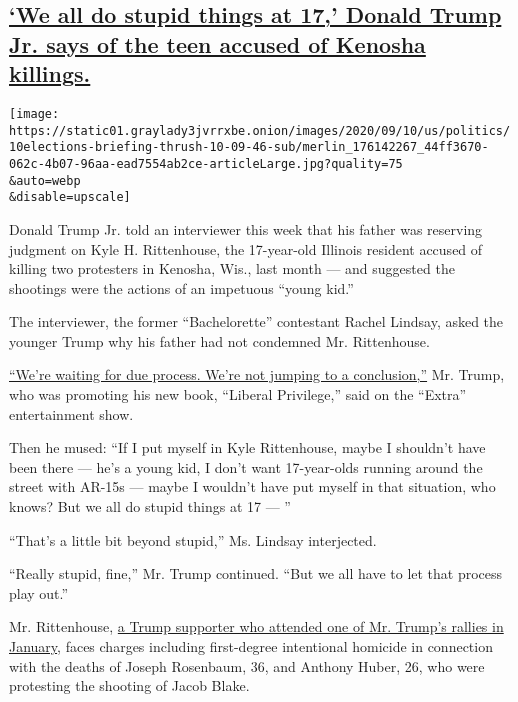 \hypertarget{we-all-do-stupid-things-at-17-donald-trump-jr-says-of-the-teen-accused-of-kenosha-killings}{%
\subsection{\texorpdfstring{\protect\hyperlink{we-all-do-stupid-things-at-17-donald-trump-jr-says-of-the-teen-accused-of-kenosha-killings}{`We
all do stupid things at 17,' Donald Trump Jr. says of the teen accused
of Kenosha
killings.}}{`We all do stupid things at 17,' Donald Trump Jr. says of the teen accused of Kenosha killings.}}\label{we-all-do-stupid-things-at-17-donald-trump-jr-says-of-the-teen-accused-of-kenosha-killings}}

\texttt{[image: https://static01.graylady3jvrrxbe.onion/images/2020/09/10/us/politics/10elections-briefing-thrush-10-09-46-sub/merlin\_176142267\_44ff3670-062c-4b07-96aa-ead7554ab2ce-articleLarge.jpg?quality=75\\\&auto=webp\\\&disable=upscale]}

Donald Trump Jr. told an interviewer this week that his father was
reserving judgment on Kyle H. Rittenhouse, the 17-year-old Illinois
resident accused of killing two protesters in Kenosha, Wis., last month
--- and suggested the shootings were the actions of an impetuous ``young
kid.''

The interviewer, the former ``Bachelorette'' contestant Rachel Lindsay,
asked the younger Trump why his father had not condemned Mr.
Rittenhouse.

\href{https://youtu.be/IhQ0fLHT100}{``We're waiting for due process.
We're not jumping to a conclusion,''} Mr. Trump, who was promoting his
new book, ``Liberal Privilege,'' said on the ``Extra'' entertainment
show.

Then he mused: ``If I put myself in Kyle Rittenhouse, maybe I shouldn't
have been there --- he's a young kid, I don't want 17-year-olds running
around the street with AR-15s --- maybe I wouldn't have put myself in
that situation, who knows? But we all do stupid things at 17 --- ''

``That's a little bit beyond stupid,'' Ms. Lindsay interjected.

``Really stupid, fine,'' Mr. Trump continued. ``But we all have to let
that process play out.''

Mr. Rittenhouse,
\href{https://www.nytimes3xbfgragh.onion/2020/08/27/us/kyle-rittenhouse-kenosha.html}{a
Trump supporter who attended one of Mr. Trump's rallies in January},
faces charges including first-degree intentional homicide in connection
with the deaths of Joseph Rosenbaum, 36, and Anthony Huber, 26, who were
protesting the shooting of Jacob Blake.

